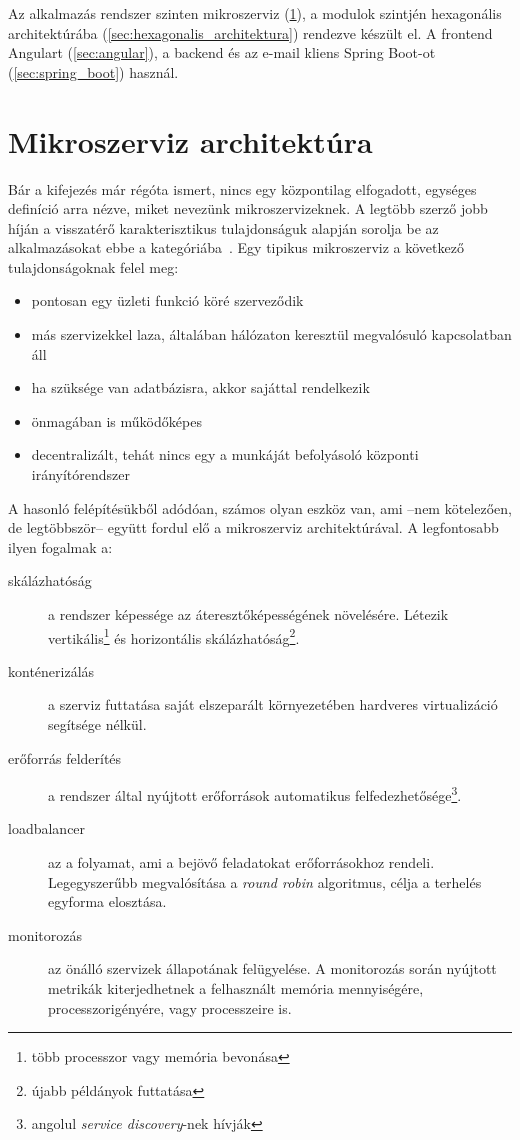 Az alkalmazás rendszer szinten mikroszerviz (\ref{sec:mikroszerviz}), a modulok szintjén hexagonális architektúrába (\ref{sec:hexagonalis_architektura}) rendezve készült el. A frontend Angulart (\ref{sec:angular}), a backend és az e-mail kliens Spring Boot-ot (\ref{sec:spring_boot}) használ.


\section{Mikroszerviz architektúra}\label{sec:mikroszerviz}
Bár a kifejezés már régóta ismert, nincs egy központilag elfogadott, egységes definíció arra nézve, miket nevezünk mikroszervizeknek. A legtöbb szerző jobb híján a visszatérő karakterisztikus tulajdonságuk alapján sorolja be az alkalmazásokat ebbe a kategóriába~\cite{OReally_Microservice_Architecture}. Egy tipikus mikroszerviz a következő tulajdonságoknak felel meg:

\begin{itemize}
	\item	pontosan egy üzleti funkció köré szerveződik 
	\item   más	szervizekkel laza, általában hálózaton keresztül megvalósuló kapcsolatban áll
	\item   ha szüksége van adatbázisra, akkor sajáttal rendelkezik
	\item	önmagában is működőképes	
	\item	decentralizált, tehát nincs egy a munkáját befolyásoló központi irányítórendszer
\end{itemize}

A hasonló felépítésükből adódóan, számos olyan eszköz van, ami --nem kötelezően, de legtöbbször-- együtt fordul elő a mikroszerviz architektúrával. A legfontosabb ilyen fogalmak a:
\begin{description}
	\item[skálázhatóság] a rendszer képessége az áteresztőképességének növelésére.
	Létezik vertikális\footnote{több processzor vagy memória bevonása} és horizontális skálázhatóság\footnote{újabb példányok futtatása}.
	
	\item[konténerizálás] a szerviz futtatása saját elszeparált környezetében hardveres virtualizáció segítsége nélkül.	

	\item[erőforrás felderítés] a rendszer által nyújtott erőforrások automatikus
	felfedezhetősége\footnote{angolul \textit{service discovery}-nek hívják}.
	
	\item[loadbalancer] az a folyamat, ami a bejövő feladatokat erőforrásokhoz rendeli. Legegyszerűbb megvalósítása a \foreignlanguage{british}{\textit{round robin}} algoritmus, célja a terhelés egyforma elosztása.
	
	\item[monitorozás] az önálló szervizek állapotának felügyelése. A monitorozás során nyújtott metrikák kiterjedhetnek a felhasznált memória mennyiségére, processzorigényére, vagy processzeire is.
\end{description}


